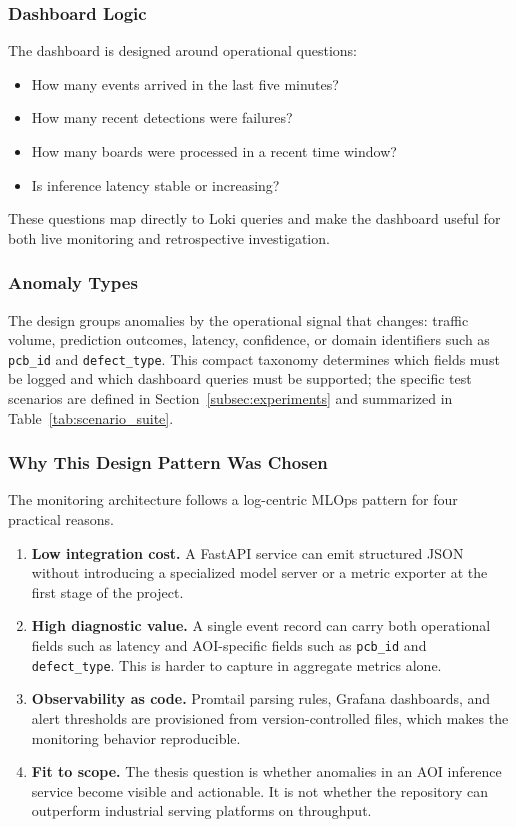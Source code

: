 \documentclass[12pt,a4paper]{article}
\begin{document}
\subsubsection{Dashboard Logic}
The dashboard is designed around operational questions:
\begin{itemize}
    \item How many events arrived in the last five minutes?
    \item How many recent detections were failures?
    \item How many boards were processed in a recent time window?
    \item Is inference latency stable or increasing?
\end{itemize}
These questions map directly to Loki queries and make the dashboard useful for
both live monitoring and retrospective investigation.

\subsubsection{Anomaly Types}
The design groups anomalies by the operational signal that changes: traffic
volume, prediction outcomes, latency, confidence, or domain identifiers such as
\texttt{pcb\_id} and \texttt{defect\_type}. This compact taxonomy determines
which fields must be logged and which dashboard queries must be supported; the
specific test scenarios are defined in Section~\ref{subsec:experiments} and summarized in
Table~\ref{tab:scenario_suite}.

\subsubsection{Why This Design Pattern Was Chosen}
The monitoring architecture follows a log-centric MLOps pattern for four
practical reasons.
\begin{enumerate}
    \item \textbf{Low integration cost.} A FastAPI service can emit structured
    JSON without introducing a specialized model server or a metric exporter at
    the first stage of the project.
    \item \textbf{High diagnostic value.} A single event record can carry both
    operational fields such as latency and AOI-specific fields such as
    \texttt{pcb\_id} and \texttt{defect\_type}. This is harder to capture in
    aggregate metrics alone.
    \item \textbf{Observability as code.} Promtail parsing rules, Grafana
    dashboards, and alert thresholds are provisioned from version-controlled
    files, which makes the monitoring behavior reproducible.
    \item \textbf{Fit to scope.} The thesis question is whether anomalies in an
    AOI inference service become visible and actionable. It is not whether the
    repository can outperform industrial serving platforms on throughput.
\end{enumerate}
\end{document}
